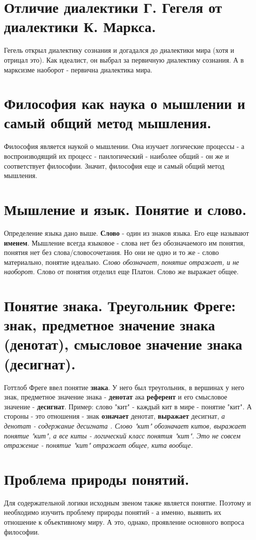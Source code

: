 \section{ Отличие диалектики Г. Гегеля от диалектики К. Маркса.}
Гегель открыл диалектику сознания и догадался до диалектики мира (хотя и отрицал это). Как идеалист, он выбрал за первичную диалектику сознания. А в марксизме наоборот - первична диалектика мира.

\section{ Философия как наука о мышлении и самый общий метод мышления.}
Философия является наукой о мышлении. Она изучает логические процессы - а воспроизводящий их процесс - панлогический - наиболее общий  - он же и соответствует философии. Значит, философия еще и самый общий метод мышления.

\section{ Мышление и язык. Понятие и слово.}
Определение языка дано выше. \textbf{Слово} - один из знаков языка. Его еще называют \textbf{именем}.  
Мышление всегда языковое - слова нет без обозначаемого им понятия, понятия нет без слова/словосочетания. Но они не одно и то же - слово материально, понятие идеально. \textit{Слово обозначает, понятие отражает, и не наоборот}. Слово от понятия отделил еще Платон.  Слово же выражает общее.

\section{ Понятие знака. Треугольник Фреге: знак, предметное значение знака (денотат), смысловое значение знака (десигнат).}
Готтлоб Фреге ввел понятие \textbf{знака}. У него был треугольник, в вершинах у него знак, предметное значение знака - \textbf{денотат} ака \textbf{референт} и его смысловое значение - \textbf{десигнат}. Пример: слово "кит" - каждый кит в мире - понятие "кит". А стороны - это отношения - знак \textbf{означает} денотат, \textbf{выражает} десигнат, \textit{а денотат - содержание десигната . Слово "кит" обозначает китов, выражает понятие "кит", а все киты - логический класс понятия "кит". Это не совсем отражение - понятие "кит" отражает общее, кита вообще.}

\section{ Проблема природы понятий.}
Для содержательной логики исходным звеном также является понятие. Поэтому и необходимо изучить проблему природы понятий - а именно, выявить их отношение к объективному миру. А это, однако, проявление основного вопроса философии. 

